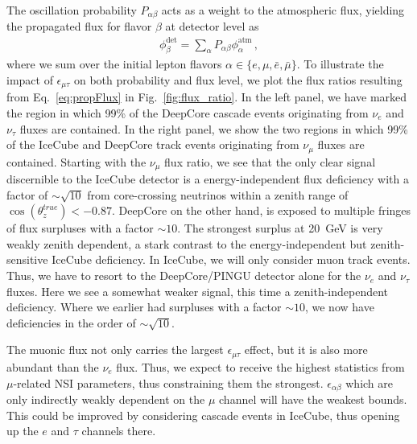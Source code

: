 \documentclass[draft=True]{revtex4-2}
\newcommand{\ztrue}{\ensuremath{\cos{(\theta_z^{true})}}}
\newcommand{\emt}{\ensuremath{\epsilon_{\mu\tau}}}
\renewcommand{\ne}{\nu_e}
\newcommand{\nm}{\nu_\mu}
\newcommand{\nt}{\nu_\tau}
\begin{document}
The oscillation probability $P_{\alpha \beta}$ acts as a weight to the atmospheric flux, yielding the propagated flux for flavor $\beta$ at detector level as 
\begin{align}\label{eq:propFlux}
    \phi_\beta^\text{det} = \sum_\alpha P_{\alpha\beta} \phi_\alpha^\text{atm} \,,
\end{align}
where we sum over the initial lepton flavors $\alpha \in \{e,\mu, \bar{e}, \bar{\mu}\}$. To illustrate the impact of $\emt$ on both probability
and flux level, we plot the flux ratios resulting from Eq.~\ref{eq:propFlux} in Fig.~\ref{fig:flux_ratio}. In the left panel, we have marked the region in which 99\% of the 
DeepCore cascade events originating from $\ne$ and $\nt$ fluxes are contained. In the right panel, we show the two regions in which 99\% of the IceCube 
and DeepCore track events originating from $\nm$ fluxes are contained. Starting with the $\nm$ flux ratio, we see that the only clear signal discernible to the IceCube detector
is a energy-independent flux deficiency with a factor of $\sim \sqrt{10}$ from core-crossing neutrinos within a zenith range of $\ztrue < -0.87$. DeepCore on the other hand, 
is exposed to multiple fringes of flux surpluses with a factor $\sim 10$. The strongest surplus at \SI{20}{\GeV} is very weakly zenith dependent, a stark contrast to the
energy-independent but zenith-sensitive IceCube deficiency.
In IceCube, we will only consider muon track events. Thus, we have to resort to the DeepCore/PINGU detector alone for the $\nu_e$ and $\nu_\tau$ fluxes.
Here we see a somewhat weaker signal, this time a zenith-independent deficiency. Where we earlier had surpluses with a factor $\sim 10$, we now have deficiencies in the order of $\sim \sqrt{10}$.

The muonic flux not only carries the largest $\emt$ effect, but it is also more abundant than the $\ne$ flux. Thus, we expect to receive the highest statistics from $\mu$-related NSI parameters,
thus constraining them the strongest. $\epsilon_{\alpha\beta}$ which are only indirectly weakly dependent on the $\mu$ channel will have the weakest bounds. This could be improved
by considering cascade events in IceCube, thus opening up the $e$ and $\tau$ channels there.
\end{document}

